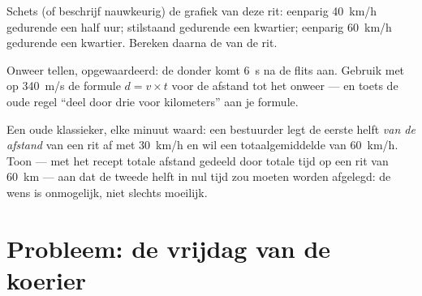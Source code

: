 \begin{exercise}[$\star\star$]\label{exo:g7:motion-average-speed:10}
Schets (of beschrijf nauwkeurig) de grafiek van deze rit: eenparig
\qty{40}{km/h} gedurende een half uur; stilstaand gedurende een
kwartier; eenparig \qty{60}{km/h} gedurende een kwartier. Bereken
daarna de  van de rit.
\end{exercise}

\begin{exercise}[$\star\star$]\label{exo:g7:motion-average-speed:11}
Onweer tellen, opgewaardeerd: de donder komt \qty{6}{s} na de flits
aan. Gebruik met  op \qty{340}{m/s} de formule $d = v \times
t$ voor de afstand tot het onweer --- en toets de oude regel ``deel
door drie voor kilometers'' aan je formule.
\end{exercise}

\begin{exercise}[$\star\star\star$]\label{exo:g7:motion-average-speed:12}
Een oude klassieker, elke minuut waard: een bestuurder legt de eerste
helft \emph{van de afstand} van een rit af met \qty{30}{km/h} en wil
een totaalgemiddelde van \qty{60}{km/h}. Toon --- met het recept
totale afstand gedeeld door totale tijd op een rit van \qty{60}{km}
--- aan dat de tweede helft in nul tijd zou moeten worden afgelegd: de
wens is onmogelijk, niet slechts moeilijk.
\end{exercise}

\section{Probleem: de vrijdag van de koerier}

